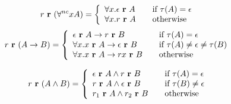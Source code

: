 \[ r \ \textbf{r} \ (\forall^{nc} x A) = \left\{ 
\begin{array}{l l}
\forall x. \epsilon \ \textbf{r} \ A & \quad \text{if $\tau (A) = \epsilon$} \\ 
\forall x. r \ \textbf{r} \ A & \quad \text{otherwise} \\

\end{array} \right.
\]
\[ r \ \textbf{r} \ (A \to B) = \left\{ 
\begin{array}{l l}
\epsilon \ \textbf{r} \ A \to r \ \textbf{r} \ B & \quad \text{if $\tau (A) = \epsilon$} \\ 
\forall x.x \ \textbf{r} \ A \to \epsilon \ \textbf{r} \ B & \quad \text{if
  $\tau (A) \neq \epsilon \neq \tau (B)$} \\
\forall x. x \ \textbf{r} \ A \to r x  \ \textbf{r} \ B & \quad \text{otherwise} \\

\end{array} \right.
\]

\[ r \ \textbf{r} \ (A \wedge B) = \left\{ 
\begin{array}{l l}
\epsilon \ \textbf{r} \ A  \wedge r \ \textbf{r} \ B & \quad \text{if $\tau (A) = \epsilon$} \\ 
r \ \textbf{r} \ A \wedge \epsilon \ \textbf{r} \ B & \quad \text{if
  $\tau (B) \neq \epsilon$} \\
r_1 \ \textbf{r} \ A \wedge r_2  \ \textbf{r} \ B & \quad \text{otherwise} \\

\end{array} \right.
\]



\medskip

